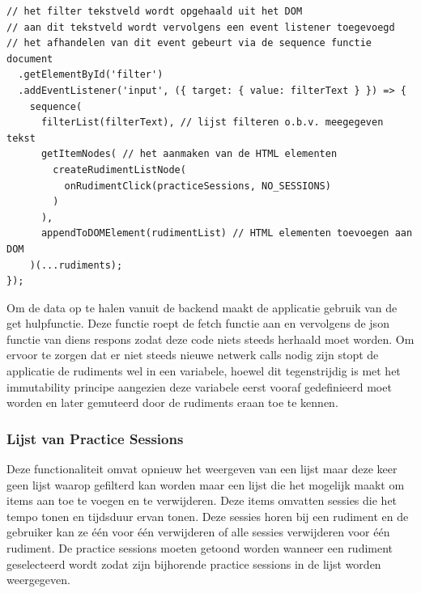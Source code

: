 \begin{lstlisting}[caption=Filteren van de rudiments - FP]
// het filter tekstveld wordt opgehaald uit het DOM
// aan dit tekstveld wordt vervolgens een event listener toegevoegd
// het afhandelen van dit event gebeurt via de sequence functie
document
  .getElementById('filter')
  .addEventListener('input', ({ target: { value: filterText } }) => {
    sequence(
      filterList(filterText), // lijst filteren o.b.v. meegegeven tekst
      getItemNodes( // het aanmaken van de HTML elementen
        createRudimentListNode(
          onRudimentClick(practiceSessions, NO_SESSIONS)
        )
      ),
      appendToDOMElement(rudimentList) // HTML elementen toevoegen aan DOM
    )(...rudiments);
});
  \end{lstlisting}


Om de data op te halen vanuit de backend maakt de applicatie gebruik van de get hulpfunctie. Deze functie roept de fetch functie aan en vervolgens de json functie van diens respons zodat deze code niets steeds herhaald moet worden. Om ervoor te zorgen dat er niet steeds nieuwe netwerk calls nodig zijn stopt de applicatie de rudiments wel in een variabele, hoewel dit tegenstrijdig is met het immutability principe aangezien deze variabele eerst vooraf gedefinieerd moet worden en later gemuteerd door de rudiments eraan toe te kennen.

 \subsubsection{Lijst van Practice Sessions}
 Deze functionaliteit omvat opnieuw het weergeven van een lijst maar deze keer geen lijst waarop gefilterd kan worden maar een lijst die het mogelijk maakt om items aan toe te voegen en te verwijderen. Deze items omvatten sessies die het tempo tonen en tijdsduur ervan tonen. Deze sessies horen bij een rudiment en de gebruiker kan ze één voor één verwijderen of alle sessies verwijderen voor één rudiment. De practice sessions moeten getoond worden wanneer een rudiment geselecteerd wordt zodat zijn bijhorende practice sessions in de lijst worden weergegeven.

